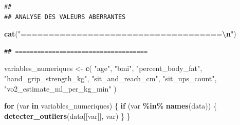 \documentclass[
]{article}
\newenvironment{Shaded}{\begin{snugshade}}{\end{snugshade}}
\newcommand{\ControlFlowTok}[1]{\textcolor[rgb]{0.13,0.29,0.53}{\textbf{#1}}}
\newcommand{\FunctionTok}[1]{\textcolor[rgb]{0.13,0.29,0.53}{\textbf{#1}}}
\newcommand{\NormalTok}[1]{#1}
\newcommand{\OtherTok}[1]{\textcolor[rgb]{0.56,0.35,0.01}{#1}}
\newcommand{\SpecialCharTok}[1]{\textcolor[rgb]{0.81,0.36,0.00}{\textbf{#1}}}
\newcommand{\StringTok}[1]{\textcolor[rgb]{0.31,0.60,0.02}{#1}}
\begin{document}
\begin{verbatim}
## 
## ANALYSE DES VALEURS ABERRANTES
\end{verbatim}

\begin{Shaded}
\begin{Highlighting}[]
\FunctionTok{cat}\NormalTok{(}\StringTok{"====================================}\SpecialCharTok{\textbackslash{}n}\StringTok{"}\NormalTok{)}
\end{Highlighting}
\end{Shaded}

\begin{verbatim}
## ====================================
\end{verbatim}

\begin{Shaded}
\begin{Highlighting}[]
\NormalTok{variables\_numeriques }\OtherTok{\textless{}{-}} \FunctionTok{c}\NormalTok{(}
  \StringTok{"age"}\NormalTok{, }\StringTok{"bmi"}\NormalTok{, }\StringTok{"percent\_body\_fat"}\NormalTok{,}
  \StringTok{"hand\_grip\_strength\_kg"}\NormalTok{, }\StringTok{"sit\_and\_reach\_cm"}\NormalTok{,}
  \StringTok{"sit\_ups\_count"}\NormalTok{, }\StringTok{"vo2\_estimate\_ml\_per\_kg\_min"}
\NormalTok{)}

\ControlFlowTok{for}\NormalTok{ (var }\ControlFlowTok{in}\NormalTok{ variables\_numeriques) \{}
  \ControlFlowTok{if}\NormalTok{ (var }\SpecialCharTok{\%in\%} \FunctionTok{names}\NormalTok{(data)) \{}
    \FunctionTok{detecter\_outliers}\NormalTok{(data[[var]], var)}
\NormalTok{  \}}
\NormalTok{\}}
\end{Highlighting}
\end{Shaded}
\end{document}
